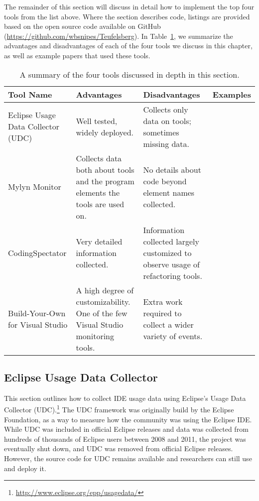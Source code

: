 
The remainder of this section will discuss in detail how to implement the top four tools from the list above.  Where the section describes code, listings are provided based on the open source code available on GitHub (\url{https://github.com/wbsnipes/Teufelsberg}). 
In Table~\ref{tab:toolsummary}, we summarize the advantages and disadvantages of each of the four tools we discuss in this chapter, as well as example papers that
used these tools.

\begin{table}
\renewcommand{\arraystretch}{1.5}
\begin{small}
\begin{tabular}{p{2cm}p{4cm}p{4cm}p{4cm}}
\textbf{Tool Name}&\textbf{Advantages}&\textbf{Disadvantages}&\textbf{Examples}\\
\hline
Eclipse Usage Data Collector (UDC)&Well tested, widely deployed.&Collects only data on tools; sometimes missing data.&\cite{liu2012initial,parnin2011resumption,murphy2012we}\\
Mylyn Monitor&Collects data both about tools and the program elements the tools are used on.&No details about code beyond element names collected.&\cite{Kersten-Mylyn,ying2011influence,murphy2009using}\\
CodingSpectator&Very detailed information collected.&Information collected largely customized to observe usage of refactoring tools.&\cite{VakilianETAL2011Richer,vakilian2012use,NegaraETAL2012Dangerous}\\
Build-Your-Own for Visual Studio&A high degree of customizability. One of the few Visual Studio monitoring tools.&Extra work required to collect a wider variety of events.&\cite{SnipesExperiencesGamifyingSoftwareDevelopment}\\
\end{tabular}
\end{small}
\caption{A summary of the four tools discussed in depth in this section.}\label{tab:toolsummary}
\end{table}

\subsection{Eclipse Usage Data Collector}
\label{EclipseUsageDataCollector}
This section outlines how to collect IDE usage data using Eclipse's Usage Data
Collector (UDC).\footnote{\url{http://www.eclipse.org/epp/usagedata/}}
The UDC framework was originally build by the Eclipse Foundation, as a way to measure how the
community was using the Eclipse IDE.
While UDC was included in official Eclipse releases and data was collected from
hundreds of thousands of Eclipse users between 2008 and 2011, the project was eventually shut down,
and UDC was removed from official Eclipse releases.
However, the source code for UDC remains available and researchers can still use and deploy it.

